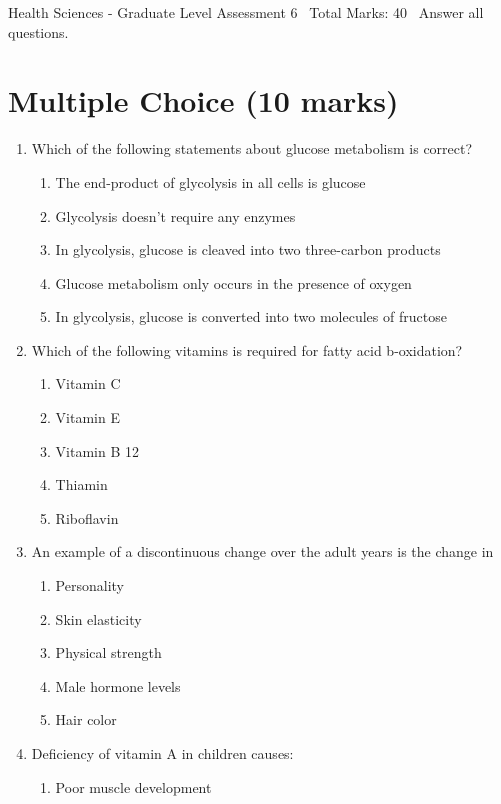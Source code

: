 \documentclass[12pt]{article}
\begin{document}
\begin{center}
Health Sciences - Graduate Level Assessment 6 \
Total Marks: 40 \
Answer all questions.
\end{center}

\section*{Multiple Choice (10 marks)}
\begin{enumerate}[label=\arabic*.]
\item Which of the following statements about glucose metabolism is correct?
\begin{enumerate}[label=(\alph*)]
    \item The end-product of glycolysis in all cells is glucose
    \item Glycolysis doesn't require any enzymes
    \item In glycolysis, glucose is cleaved into two three-carbon products
    \item Glucose metabolism only occurs in the presence of oxygen
    \item In glycolysis, glucose is converted into two molecules of fructose
\end{enumerate}
\item Which of the following vitamins is required for fatty acid b-oxidation?
\begin{enumerate}[label=(\alph*)]
    \item Vitamin C
    \item Vitamin E
    \item Vitamin B 12
    \item Thiamin
    \item Riboflavin
\end{enumerate}
\item An example of a discontinuous change over the adult years is the change in
\begin{enumerate}[label=(\alph*)]
    \item Personality
    \item Skin elasticity
    \item Physical strength
    \item Male hormone levels
    \item Hair color
\end{enumerate}
\item Deficiency of vitamin A in children causes:
\begin{enumerate}[label=(\alph*)]
    \item Poor muscle development

\end{enumerate}
\end{enumerate}
\end{document}
